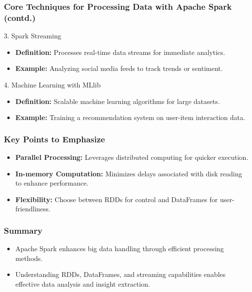 \documentclass[aspectratio=169]{beamer}
\begin{document}
\begin{frame}
    \frametitle{Core Techniques for Processing Data with Apache Spark (contd.)}
    \begin{block}{3. Spark Streaming}
        \begin{itemize}
            \item \textbf{Definition:} Processes real-time data streams for immediate analytics.
            \item \textbf{Example:} Analyzing social media feeds to track trends or sentiment.
        \end{itemize}
    \end{block}
    
    \begin{block}{4. Machine Learning with MLlib}
        \begin{itemize}
            \item \textbf{Definition:} Scalable machine learning algorithms for large datasets.
            \item \textbf{Example:} Training a recommendation system on user-item interaction data.
        \end{itemize}
    \end{block}
\end{frame}

\begin{frame}
    \frametitle{Key Points to Emphasize}
    \begin{itemize}
        \item \textbf{Parallel Processing:} Leverages distributed computing for quicker execution.
        \item \textbf{In-memory Computation:} Minimizes delays associated with disk reading to enhance performance.
        \item \textbf{Flexibility:} Choose between RDDs for control and DataFrames for user-friendliness.
    \end{itemize}
\end{frame}

\begin{frame}
    \frametitle{Summary}
    \begin{itemize}
        \item Apache Spark enhances big data handling through efficient processing methods.
        \item Understanding RDDs, DataFrames, and streaming capabilities enables effective data analysis and insight extraction.
    \end{itemize}
\end{frame}
\end{document}
